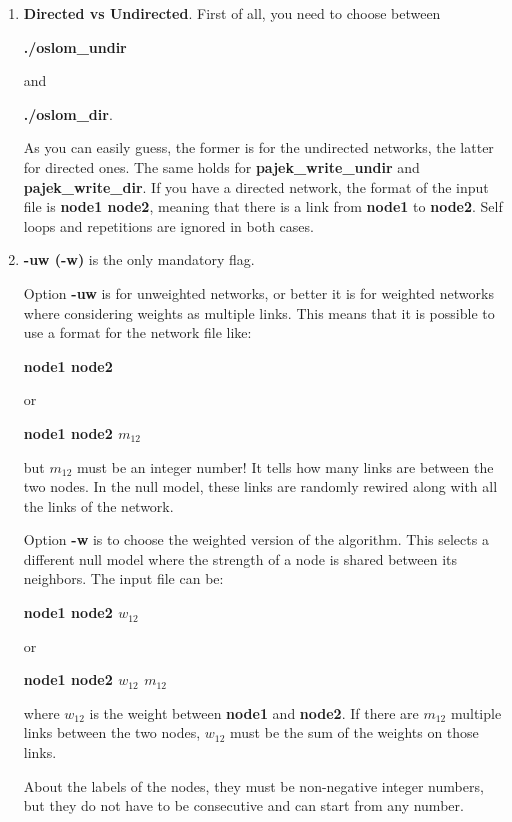 \documentclass[11pt]{article}
\begin{document}
\begin{enumerate}
  \item \textbf{Directed vs Undirected}. First of all, you need to choose between 
  
  \textbf{./oslom\_undir} 
  
  and  
  
  \textbf{./oslom\_dir}. 
  
  As you can easily guess, the former is for the undirected networks,
  the latter for directed ones. 
The same holds for \textbf{pajek\_write\_undir} and  \textbf{pajek\_write\_dir}.
If you have a directed network, the format of the input file is
\textbf{node1 node2}, meaning that there is a link from 
\textbf{node1} to  \textbf{node2}.  Self loops and repetitions are ignored in both cases.

  \item \textbf{-uw (-w)} is the only mandatory flag. 
  
  Option \textbf{-uw} is for unweighted networks, or better it is for
  weighted networks where considering weights as multiple links. 
This means that it is possible to use a format for the network file like: 
  
  \textbf{node1 node2} 
  
  or 
  
  \textbf{node1 node2 $m_{12}$}
  
  
  but $m_{12}$ must be an integer number! It tells how many links are
  between the two nodes. In the null model, 
these links are randomly rewired along with all the links of the network.
  
  Option \textbf{-w} is to choose the weighted version of the
  algorithm. 
This selects a different null model where the strength of a node is shared between its neighbors. The input file can be: 
  
   \textbf{node1 node2 $w_{12}$} 
  
  or 
  
  \textbf{node1 node2 $w_{12}$ $m_{12}$}

  where $w_{12}$ is the weight between \textbf{node1} and
  \textbf{node2}. If there are $m_{12}$ multiple links between the two
  nodes, $w_{12}$ must be the sum of the weights on those links.  
  
  About the labels of the nodes, they must be non-negative integer
  numbers, but they do not have to be consecutive and can start from any number.
  
  

\end{enumerate}
\end{document}
